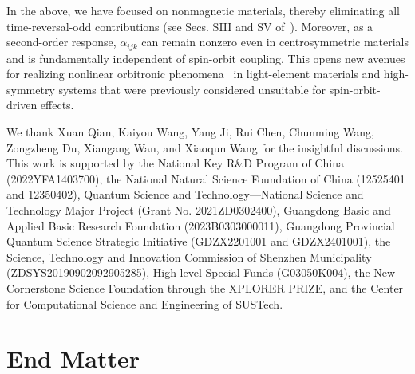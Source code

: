 \documentclass[aps,prl,twocolumn,amsmath,amssymb,showpacs, superscriptaddress,notitlepage,longbibliography,10pt]{revtex4-1}
\begin{document}
In the above, we have focused on nonmagnetic materials, thereby eliminating all time-reversal-odd contributions (see Secs. SIII and SV of~\cite{Supp}). Moreover, as a second-order response, $\alpha_{ijk}$ can remain nonzero even in centrosymmetric materials and is fundamentally independent of spin-orbit coupling. This opens new avenues for realizing nonlinear orbitronic phenomena~\cite{ZhangSC05prl,Inoue08prb,Yuriy21epl,Choi23nature,WangP24aem,Jo24npj,WuXS24prl,Dimi24prl,Dimi25prl} in light-element materials and high-symmetry systems that were previously considered unsuitable for spin-orbit-driven effects.


\begin{acknowledgments}
We thank Xuan Qian, Kaiyou Wang, Yang Ji, Rui Chen, Chunming Wang, Zongzheng Du, Xiangang Wan, and Xiaoqun Wang for the insightful discussions. This work is supported by the National Key R$\&$D Program of China (2022YFA1403700), the National Natural Science Foundation of China (12525401 and 12350402), Quantum Science and Technology—National Science and Technology Major Project (Grant No. 2021ZD0302400), Guangdong Basic and Applied Basic Research Foundation (2023B0303000011), Guangdong Provincial Quantum Science Strategic Initiative (GDZX2201001 and GDZX2401001), the Science, Technology and Innovation Commission of Shenzhen Municipality (ZDSYS20190902092905285),
High-level Special Funds (G03050K004), the New Cornerstone Science Foundation through the XPLORER PRIZE, and the Center for Computational Science and Engineering of SUSTech.
\end{acknowledgments}







\appendix


\renewcommand{\theequation}{A\arabic{equation}}

\setcounter{equation}{0}




\section{{\large End Matter}}
\end{document}
